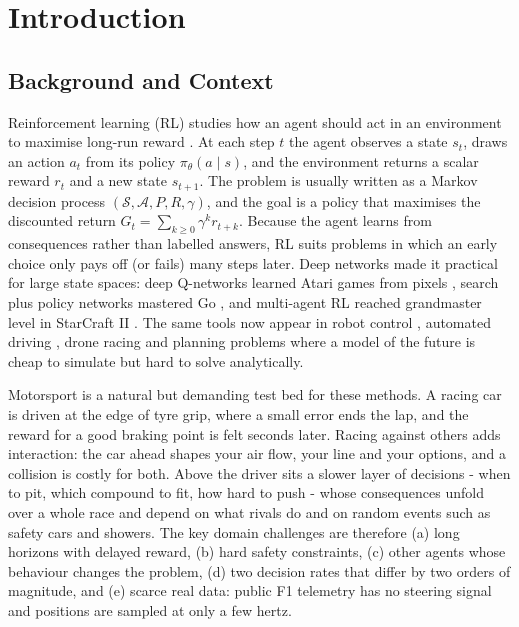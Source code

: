 \documentclass{ieeeaccess}
\begin{document}
\titlepgskip=-15pt

\maketitle

\section{Introduction}
\label{sec:introduction}

\subsection{Background and Context}

Reinforcement learning (RL) studies how an agent should act in an environment to
maximise long-run reward \cite{b1}. At each step \(t\) the agent observes a state \(s_t\),
draws an action \(a_t\) from its policy \(\pi_\theta(a\mid s)\), and the environment
returns a scalar reward \(r_t\) and a new state \(s_{t+1}\). The problem is usually
written as a Markov decision process \((\mathcal S,\mathcal A,P,R,\gamma)\), and the
goal is a policy that maximises the discounted return
\(G_t=\sum_{k\ge 0}\gamma^k r_{t+k}\). Because the agent learns from consequences
rather than labelled answers, RL suits problems in which an early choice only pays
off (or fails) many steps later. Deep networks made it practical for large state
spaces: deep Q-networks learned Atari games from pixels \cite{b2}, search plus policy
networks mastered Go \cite{b3}, and multi-agent RL reached grandmaster level in
StarCraft II \cite{b4}. The same tools now appear in robot control \cite{b5}, automated
driving \cite{b6}, drone racing \cite{b7} and planning problems where a model of the future is
cheap to simulate but hard to solve analytically.

Motorsport is a natural but demanding test bed for these methods. A racing car is
driven at the edge of tyre grip, where a small error ends the lap, and the reward
for a good braking point is felt seconds later. Racing against others adds
interaction: the car ahead shapes your air flow, your line and your options, and a
collision is costly for both. Above the driver sits a slower layer of decisions -
when to pit, which compound to fit, how hard to push - whose consequences unfold
over a whole race and depend on what rivals do and on random events such as safety
cars and showers. The key domain challenges are therefore (a) long horizons with
delayed reward, (b) hard safety constraints, (c) other agents whose behaviour
changes the problem, (d) two decision rates that differ by two orders of magnitude,
and (e) scarce real data: public F1 telemetry has no steering signal and positions
are sampled at only a few hertz.
\end{document}
